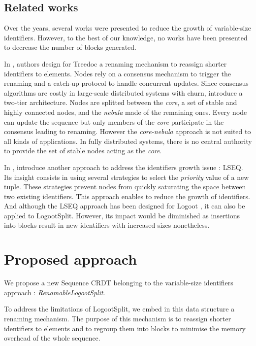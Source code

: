 \documentclass[sigplan,10pt]{acmart}
\begin{document}
\subsection{Related works}

Over the years, several works were presented to reduce the growth of variable-size identifiers.
However, to the best of our knowledge, no works have been presented to decrease the number of blocks generated.

In \cite{letia:hal-01248270,zawirski:hal-01248197}, authors design for Treedoc \cite{5158449} a renaming mechanism to reassign shorter identifiers to elements.
Nodes rely on a consensus mechanism to trigger the renaming and a catch-up protocol to handle concurrent updates.
Since consensus algorithms are costly in large-scale distributed systems with churn, \citet{letia:hal-01248270} introduce a two-tier architecture.
Nodes are splitted between the \emph{core}, a set of stable and highly connected nodes, and the \emph{nebula} made of the remaining ones.
Every node can update the sequence but only members of the \emph{core} participate in the consensus leading to renaming.
However the \emph{core-nebula} approach is not suited to all kinds of applications.
In fully distributed systems, there is no central authority to provide the set of stable nodes acting as the \emph{core}.

In \cite{nedelec_2013_lseq,doi:10.1002/cpe.4108}, \citeauthor{nedelec_2013_lseq} introduce another approach to address the identifiers growth issue : LSEQ.
Its insight consists in using several strategies to select the \emph{priority} value of a new tuple.
These strategies prevent nodes from quickly saturating the space between two existing identifiers.
This approach enables to reduce the growth of identifiers.
And although the LSEQ approach has been designed for Logoot \cite{WeissICDCS09}, it can also be applied to LogootSplit.
However, its impact would be diminished as insertions into blocks result in new identifiers with increased sizes nonetheless.

\section{Proposed approach}

We propose a new Sequence \ac{CRDT} belonging to the variable-size identifiers approach : \emph{RenamableLogootSplit}.

To address the limitations of LogootSplit, we embed in this data structure a renaming mechanism.
The purpose of this mechanism is to reassign shorter identifiers to elements and to regroup them into blocks to minimise the memory overhead of the whole sequence.
\end{document}
